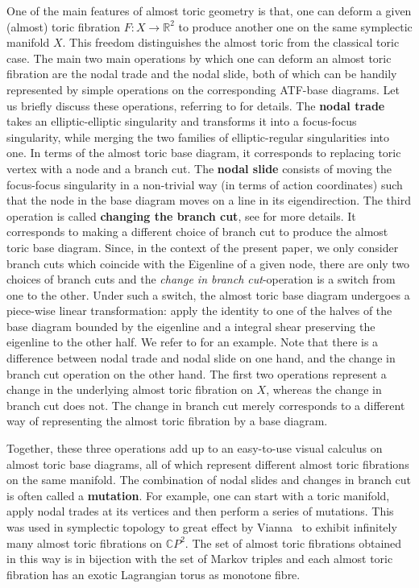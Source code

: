 \documentclass[12pt,a4paper,draft]{scrartcl}
\begin{document}
One of the main features of almost toric geometry is that, one can deform a given (almost) toric fibration $F \colon X \rightarrow \mathbb{R}^2$ to produce another one on the same symplectic manifold $X$. This freedom distinguishes the almost toric from the classical toric case. The main two main operations by which one can deform an almost toric fibration are the nodal trade and the nodal slide, both of which can be handily represented by simple operations on the corresponding ATF-base diagrams. Let us briefly discuss these operations, referring to \cite[Sections 8.2-8.3]{evans2021atfs} for details. The \textbf{nodal trade} takes an elliptic-elliptic singularity and transforms it into a focus-focus singularity, while merging the two families of elliptic-regular singularities into one. In terms of the almost toric base diagram, it corresponds to replacing toric vertex with a node and a branch cut. The \textbf{nodal slide} consists of moving the focus-focus singularity in a non-trivial way (in terms of action coordinates) such that the node in the base diagram moves on a line in its eigendirection. The third operation is called \textbf{changing the branch cut}, see \cite[Sections 8.4]{evans2021atfs} for more details. It corresponds to making a different choice of branch cut to produce the almost toric base diagram. Since, in the context of the present paper, we only consider branch cuts which coincide with the Eigenline of a given node, there are only two choices of branch cuts and the \textit{change in branch cut}-operation is a switch from one to the other. Under such a switch, the almost toric base diagram undergoes a piece-wise linear transformation: apply the identity to one of the halves of the base diagram bounded by the eigenline and a integral shear preserving the eigenline to the other half. We refer to \cite[Example 8.15]{evans2021atfs} for an example. Note that there is a difference between nodal trade and nodal slide on one hand, and the change in branch cut operation on the other hand. The first two operations represent a change in the underlying almost toric fibration on $X$, whereas the change in branch cut does not. The change in branch cut merely corresponds to a different way of representing the almost toric fibration by a base diagram.

Together, these three operations add up to an easy-to-use visual calculus on almost toric base diagrams, all of which represent different almost toric fibrations on the same manifold. The combination of nodal slides and changes in branch cut is often called a \textbf{mutation}. For example, one can start with a toric manifold, apply nodal trades at its vertices and then perform a series of mutations. This was used in symplectic topology to great effect by Vianna~\cite{Via16} to exhibit infinitely many almost toric fibrations on $\mathbb{C}P^2$. The set of almost toric fibrations obtained in this way is in bijection with the set of Markov triples and each almost toric fibration has an exotic Lagrangian torus as monotone fibre.
\end{document}
